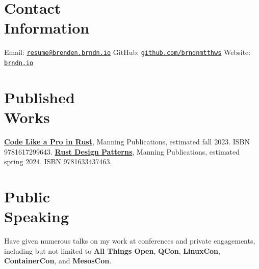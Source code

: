 \documentclass[margin,line]{resume}
\begin{document}
 
\begin{resume}

    \section{\mysidestyle Contact\\Information}

    Email: \href{mailto:resume@brenden.brndn.io}{\texttt{resume@brenden.brndn.io}} \hfill
    GitHub: \href{https://github.com/brndnmtthws}{\texttt{github.com/brndnmtthws}} \hfill
    Website: \href{https://brndn.io}{\texttt{brndn.io}} \hfill
    \vspace{3mm}

    \section{\mysidestyle Published\\Works}

    \href{https://www.manning.com/books/code-like-a-pro-in-rust}{\textbf{Code Like a Pro in Rust}}, Manning Publications,
    estimated fall 2023. ISBN 9781617299643.
    \linebreak \href{https://www.manning.com/books/rust-design-patterns}{\textbf{Rust Design Patterns}}, Manning Publications,
    estimated spring 2024. ISBN 9781633437463.

    \vspace{3mm}

    \section{\mysidestyle Public\\Speaking}

    Have given numerous talks on my work at conferences and private engagements,
    including but not limited to \textbf{All Things Open}, \textbf{QCon},
    \textbf{LinuxCon}, \textbf{ContainerCon}, and \textbf{MesosCon}.
    
    \vspace{3mm}


\end{resume}
\end{document}
